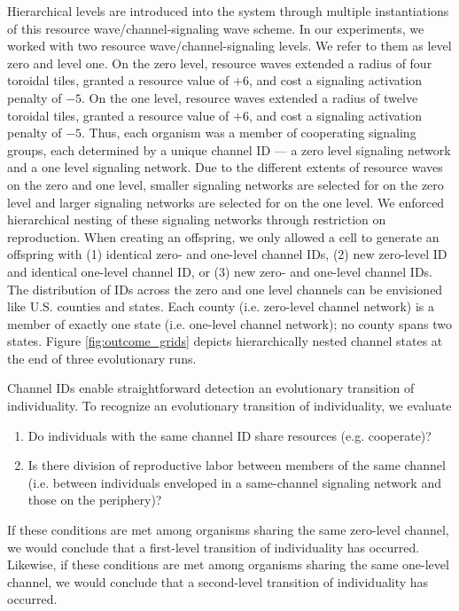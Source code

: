 Hierarchical levels are introduced into the system through multiple instantiations of this resource wave/channel-signaling wave scheme.
In our experiments, we worked with two resource wave/channel-signaling levels.
We refer to them as level zero and level one.
On the zero level, resource waves extended a radius of four toroidal tiles, granted a resource value of $+6$, and cost a signaling activation penalty of $-5$.
On the one level, resource waves extended a radius of twelve toroidal tiles, granted a resource value of $+6$, and cost a signaling activation penalty of $-5$.
Thus, each organism was a member of cooperating signaling groups, each determined by a unique channel ID --- a zero level signaling network and a one level signaling network.
Due to the different extents of resource waves on the zero and one level, smaller signaling networks are selected for on the zero level and larger signaling networks are selected for on the one level.
We enforced hierarchical nesting of these signaling networks through restriction on reproduction.
When creating an offspring, we only allowed a cell to generate an offspring with (1) identical zero- and one-level channel IDs, (2) new zero-level ID and identical one-level channel ID, or (3) new zero- and one-level channel IDs.
The distribution of IDs across the zero and one level channels can be envisioned like U.S. counties and states.
Each county (i.e. zero-level channel network) is a member of exactly one state (i.e. one-level channel network);
no county spans two states.
Figure \ref{fig:outcome_grids} depicts hierarchically nested channel states at the end of three evolutionary runs.

Channel IDs enable straightforward detection an evolutionary transition of individuality.
To recognize an evolutionary transition of individuality, we evaluate
\begin{enumerate}
\item Do individuals with the same channel ID share resources (e.g. cooperate)?
\item Is there division of reproductive labor between members of the same channel (i.e. between individuals enveloped in a same-channel signaling network and those on the periphery)?
\end{enumerate}

If these conditions are met among organisms sharing the same zero-level channel, we would conclude that a first-level transition of individuality has occurred.
Likewise, if these conditions are met among organisms sharing the same one-level channel, we would conclude that a second-level transition of individuality has occurred.

